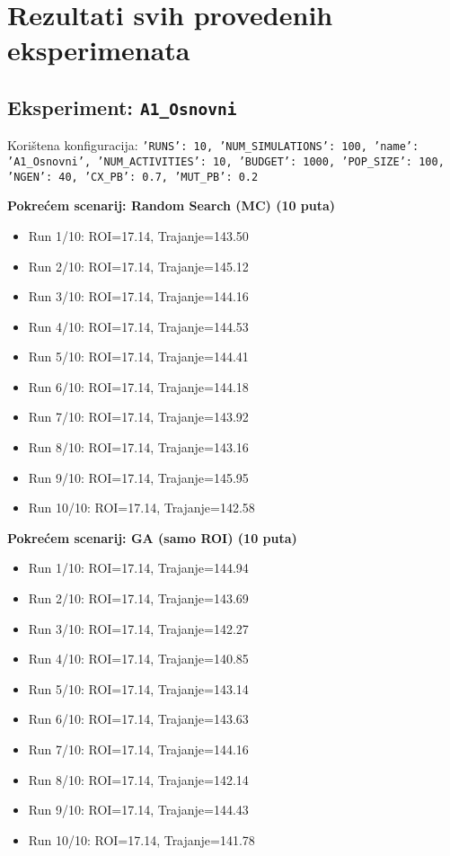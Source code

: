 \section{Rezultati svih provedenih eksperimenata}

\subsection*{Eksperiment: \texttt{A1\_Osnovni}}
Korištena konfiguracija: \texttt{'RUNS': 10, 'NUM\_SIMULATIONS': 100, 'name': 'A1\_Osnovni', 'NUM\_ACTIVITIES': 10, 'BUDGET': 1000, 'POP\_SIZE': 100, 'NGEN': 40, 'CX\_PB': 0.7, 'MUT\_PB': 0.2}

\textbf{Pokrećem scenarij: Random Search (MC) (10 puta)}
\begin{itemize}
    \item Run 1/10: ROI=17.14, Trajanje=143.50
    \item Run 2/10: ROI=17.14, Trajanje=145.12
    \item Run 3/10: ROI=17.14, Trajanje=144.16
    \item Run 4/10: ROI=17.14, Trajanje=144.53
    \item Run 5/10: ROI=17.14, Trajanje=144.41
    \item Run 6/10: ROI=17.14, Trajanje=144.18
    \item Run 7/10: ROI=17.14, Trajanje=143.92
    \item Run 8/10: ROI=17.14, Trajanje=143.16
    \item Run 9/10: ROI=17.14, Trajanje=145.95
    \item Run 10/10: ROI=17.14, Trajanje=142.58
\end{itemize}

\textbf{Pokrećem scenarij: GA (samo ROI) (10 puta)}
\begin{itemize}
    \item Run 1/10: ROI=17.14, Trajanje=144.94
    \item Run 2/10: ROI=17.14, Trajanje=143.69
    \item Run 3/10: ROI=17.14, Trajanje=142.27
    \item Run 4/10: ROI=17.14, Trajanje=140.85
    \item Run 5/10: ROI=17.14, Trajanje=143.14
    \item Run 6/10: ROI=17.14, Trajanje=143.63
    \item Run 7/10: ROI=17.14, Trajanje=144.16
    \item Run 8/10: ROI=17.14, Trajanje=142.14
    \item Run 9/10: ROI=17.14, Trajanje=144.43
    \item Run 10/10: ROI=17.14, Trajanje=141.78
\end{itemize}

